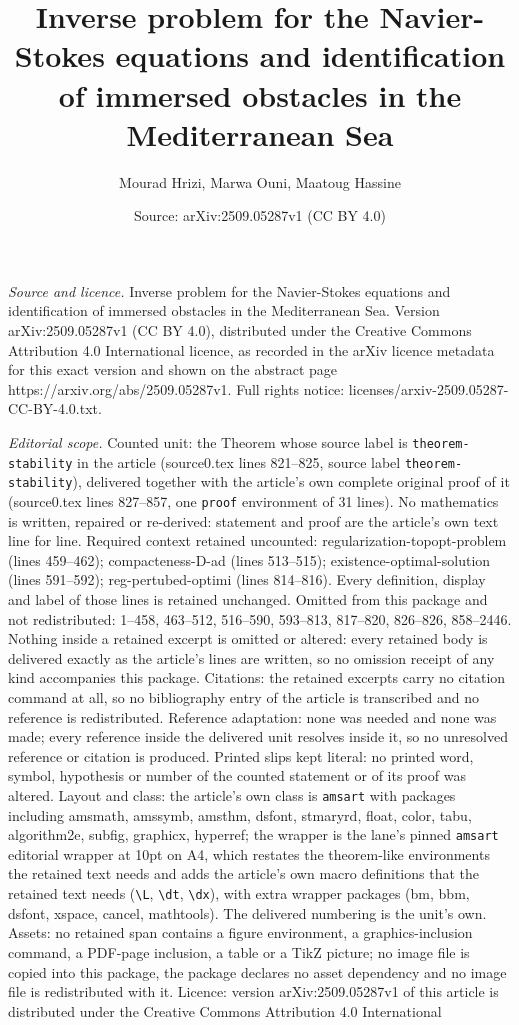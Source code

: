 \documentclass[10pt,a4paper]{amsart}
\title[Inverse problem for the Navier-Stokes equations and identifi]{Inverse problem for the Navier-Stokes equations and identification of immersed obstacles in the Mediterranean Sea}
\author{Mourad Hrizi, Marwa Ouni, Maatoug Hassine}
\date{Source: arXiv:2509.05287v1 (CC BY 4.0)}
\begin{document}
\maketitle

\noindent\emph{Source and licence.} Inverse problem for the Navier-Stokes equations and identification of immersed obstacles in the Mediterranean Sea. Version arXiv:2509.05287v1 (CC BY 4.0), distributed under the Creative Commons Attribution 4.0 International licence, as recorded in the arXiv licence metadata for this exact version and shown on the abstract page https://arxiv.org/abs/2509.05287v1. Full rights notice: licenses/arxiv-2509.05287-CC-BY-4.0.txt.\par\smallskip

\noindent\textit{Editorial scope.} Counted unit: the Theorem whose source label is \texttt{theorem-stability} in the article (source0.tex lines 821--825, source label \texttt{theorem-stability}), delivered together with the article's own complete original proof of it (source0.tex lines 827--857, one \texttt{proof} environment of 31 lines). No mathematics is written, repaired or re-derived: statement and proof are the article's own text line for line. Required context retained uncounted: regularization-topopt-problem (lines 459--462); compacteness-D-ad (lines 513--515); existence-optimal-solution (lines 591--592); reg-pertubed-optimi (lines 814--816). Every definition, display and label of those lines is retained unchanged. Omitted from this package and not redistributed: 1--458, 463--512, 516--590, 593--813, 817--820, 826--826, 858--2446. Nothing inside a retained excerpt is omitted or altered: every retained body is delivered exactly as the article's lines are written, so no omission receipt of any kind accompanies this package. Citations: the retained excerpts carry no citation command at all, so no bibliography entry of the article is transcribed and no reference is redistributed. Reference adaptation: none was needed and none was made; every reference inside the delivered unit resolves inside it, so no unresolved reference or citation is produced. Printed slips kept literal: no printed word, symbol, hypothesis or number of the counted statement or of its proof was altered. Layout and class: the article's own class is \texttt{amsart} with packages including amsmath, amssymb, amsthm, dsfont, stmaryrd, float, color, tabu, algorithm2e, subfig, graphicx, hyperref; the wrapper is the lane's pinned \texttt{amsart} editorial wrapper at 10pt on A4, which restates the theorem-like environments the retained text needs and adds the article's own macro definitions that the retained text needs (\texttt{\textbackslash L}, \texttt{\textbackslash dt}, \texttt{\textbackslash dx}), with extra wrapper packages (bm, bbm, dsfont, xspace, cancel, mathtools). The delivered numbering is the unit's own. Assets: no retained span contains a figure environment, a graphics-inclusion command, a PDF-page inclusion, a table or a TikZ picture; no image file is copied into this package, the package declares no asset dependency and no image file is redistributed with it. Licence: version arXiv:2509.05287v1 of this article is distributed under the Creative Commons Attribution 4.0 International 
\end{document}
